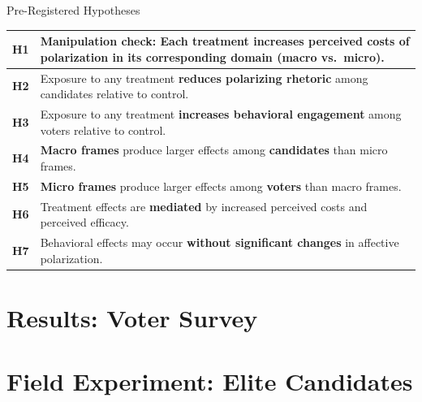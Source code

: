 \documentclass[aspectratio=169]{beamer}
\begin{document}
\begin{frame}{Pre-Registered Hypotheses}
  \begin{center}
  \renewcommand{\arraystretch}{1.4}
  \begin{tabular}{>{\bfseries}p{0.8cm} p{10.5cm}}
    \toprule
    H1 & \textbf{Manipulation check:} Each treatment increases perceived costs of polarization in its corresponding domain (macro vs.\ micro). \\
    \midrule
    H2 & Exposure to any treatment \textbf{reduces polarizing rhetoric} among candidates relative to control. \\
    H3 & Exposure to any treatment \textbf{increases behavioral engagement} among voters relative to control. \\
    \midrule
    H4 & \textcolor{macroC}{\textbf{Macro frames}} produce larger effects among \textbf{candidates} than micro frames. \\
    H5 & \textcolor{microC}{\textbf{Micro frames}} produce larger effects among \textbf{voters} than macro frames. \\
    \midrule
    H6 & Treatment effects are \textbf{mediated} by increased perceived costs and perceived efficacy. \\
    H7 & Behavioral effects may occur \textbf{without significant changes} in affective polarization. \\
    \bottomrule
  \end{tabular}
  \end{center}
\end{frame}

\section{Results: Voter Survey}

\section{Field Experiment: Elite Candidates}
\end{document}
